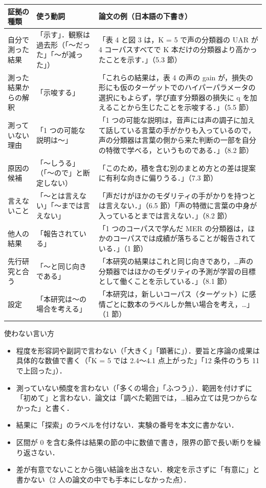 \documentclass[a4paper,10pt]{ltjsarticle}
\begin{document}
\begin{center}
\small
\begin{tabular}{>{\raggedright}p{3.0cm}>{\raggedright}p{3.2cm}>{\raggedright\arraybackslash}p{9.7cm}}
\toprule
証拠の種類 & 使う動詞 & 論文の例（日本語の下書き） \\
\midrule
自分で測った結果 & 「示す」．観察は過去形（「〜だった」「〜が減った」） & 「表 4 と図 3 は，K = 5 で声の分類器の UAR が 4 コーパスすべてで K 本だけの分類器より高かったことを示す．」（5.3 節） \\
測った結果からの解釈 & 「示唆する」 & 「これらの結果は，表 4 の声の gain が，損失の形にも仮のターゲットでのハイパーパラメータの選択にもよらず，学び直す分類器の損失に q を加えることから生じたことを示唆する．」（5.5 節） \\
測っていない理由 & 「1 つの可能な説明は〜」 & 「1 つの可能な説明は，音声には声の調子に加えて話している言葉の手がかりも入っているので，声の分類器は言葉の側から来た判断の一部を自分の特徴で学べる，というものである．」（8.2 節） \\
原因の候補 & 「〜しうる」（「〜ので」と断定しない） & 「このため，積を含む別のまとめ方との差は提案に有利な向きに偏りうる．」（7.3 節） \\
言えないこと & 「〜とは言えない」「〜までは言えない」 & 「声だけがほかのモダリティの手がかりを持つとは言えない．」（6.5 節）「声の特徴に言葉の中身が入っているとまでは言えない．」（8.2 節） \\
他人の結果 & 「報告されている」 & 「1 つのコーパスで学んだ MER の分類器は，ほかのコーパスでは成績が落ちることが報告されている．」（1 節） \\
先行研究と合う & 「〜と同じ向きである」 & 「本研究の結果はこれと同じ向きであり，…声の分類器ではほかのモダリティの予測が学習の目標として働くことを示している．」（8.1 節） \\
設定 & 「本研究は〜の場合を考える」 & 「本研究は，新しいコーパス（ターゲット）に感情ごとに数本のラベルしか無い場合を考え，…」（1 節） \\
\bottomrule
\end{tabular}
\end{center}

\begin{waku}{使わない言い方}
\small
\begin{itemize}
  \item 程度を形容詞や副詞で言わない（「大きく」「顕著に」）．要旨と序論の成果は具体的な数値で書く（「K = 5 では 2.4〜4.1 点上がった」「12 条件のうち 11 で上回った」）．
  \item 測っていない頻度を言わない（「多くの場合」「ふつう」）．範囲を付けずに「初めて」と言わない．論文は「調べた範囲では，…組み立ては見つからなかった」と書く．
  \item 結果に「探索」のラベルを付けない．実験の番号を本文に書かない．
  \item 区間が 0 を含む条件は結果の節の中に数値で書き，限界の節で長い断りを繰り返さない．
  \item 差が有意でないことから強い結論を出さない．検定を示さずに「有意に」と書かない（2 人の論文の中でも手本にしなかった点）．
\end{itemize}
\end{waku}
\end{document}
